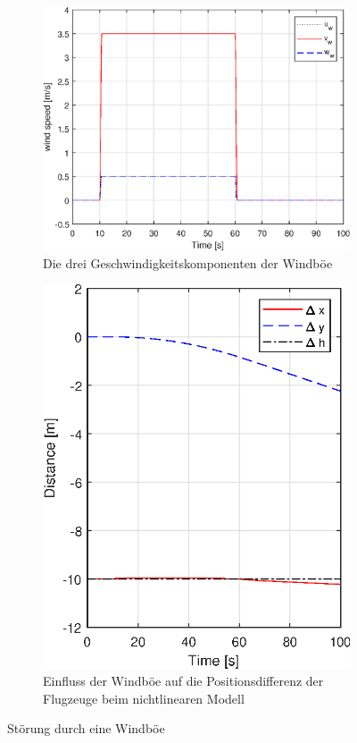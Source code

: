  \begin{figure}[h] %
	\centering
	\begin{subfigure}{.49\textwidth}
		\centering
		\includegraphics[width=\linewidth]{./Bilder/windboe.eps}
		\caption{Die drei Geschwindigkeitskomponenten der Windböe}
		\label{fig:windboe}
	\end{subfigure}
	\hfill
	\begin{subfigure}{.49\textwidth}
		\centering
		\includegraphics[width=0.65\linewidth]{./Bilder/distance_xyz_windboe.eps}
		\caption{Einfluss der Windböe auf die Positionsdifferenz der Flugzeuge beim nichtlinearen Modell}
		\label{fig:distance_xyz_windboe}
	\end{subfigure}
	\caption{Störung durch eine Windböe}
	\label{fig:pos_windboe}
\end{figure}

